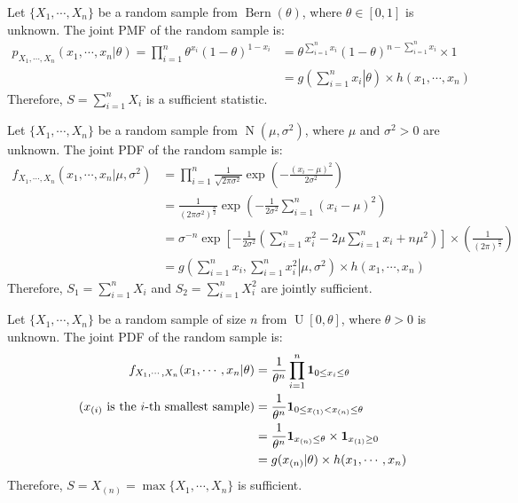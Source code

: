 \documentclass{huhtakm-template-book-v2}
\DeclareMathOperator{\Bern}{Bern}
\DeclareMathOperator{\N}{N}
\DeclareMathOperator{\U}{U}
\begin{document}
\begin{eg}
	\label{Chapter 1 (Example) Sufficient statistics of Bern(theta)}
	Let $\{X_{1},\cdots,X_{n}\}$ be a random sample from $\Bern(\theta)$, where $\theta\in[0,1]$ is unknown. The joint PMF of the random sample is:
	\begin{align*}
		p_{X_{1},\cdots,X_{n}}(x_{1},\cdots,x_{n}|\theta)=\prod_{i=1}^{n}\theta^{x_{i}}(1-\theta)^{1-x_{i}}&=\theta^{\sum_{i=1}^{n}x_{i}}(1-\theta)^{n-\sum_{i=1}^{n}x_{i}}\times 1\\
		&=g\left(\left.\sum_{i=1}^{n}x_{i}\right|\theta\right)\times h(x_{1},\cdots,x_{n})		
	\end{align*}
	Therefore, $S=\sum_{i=1}^{n}X_{i}$ is a sufficient statistic.
\end{eg}
\begin{eg}
	Let $\{X_{1},\cdots,X_{n}\}$ be a random sample from $\N(\mu,\sigma^{2})$, where $\mu$ and $\sigma^{2}>0$ are unknown. The joint PDF of the random sample is:
	\begin{align*}
		f_{X_{1},\cdots,X_{n}}(x_{1},\cdots,x_{n}|\mu,\sigma^{2})&=\prod_{i=1}^{n}\frac{1}{\sqrt{2\pi\sigma^{2}}}\exp\left(-\frac{(x_{i}-\mu)^{2}}{2\sigma^{2}}\right)\\
		&=\frac{1}{(2\pi\sigma^{2})^{\frac{n}{2}}}\exp\left(-\frac{1}{2\sigma^{2}}\sum_{i=1}^{n}(x_{i}-\mu)^{2}\right)\\
		&=\sigma^{-n}\exp\left[-\frac{1}{2\sigma^{2}}\left(\sum_{i=1}^{n}x_{i}^{2}-2\mu\sum_{i=1}^{n}x_{i}+n\mu^{2}\right)\right]\times\left(\frac{1}{(2\pi)^{
		\frac{n}{2}}}\right)\\
		&=g\left(\left.\sum_{i=1}^{n}x_{i},\sum_{i=1}^{n}x_{i}^{2}\right|\mu,\sigma^{2}\right)\times h(x_{1},\cdots,x_{n})
	\end{align*}
	Therefore, $S_{1}=\sum_{i=1}^{n}X_{i}$ and $S_{2}=\sum_{i=1}^{n}X_{i}^{2}$ are jointly sufficient.
\end{eg}
\begin{eg}
	Let $\{X_{1},\cdots,X_{n}\}$ be a random sample of size $n$ from $\U[0,\theta]$, where $\theta>0$ is unknown. The joint PDF of the random sample is:
	\begin{align*}
		f_{X_{1},\cdots,X_{n}}(x_{1},\cdots,x_{n}|\theta)&=\frac{1}{\theta^{n}}\prod_{i=1}^{n}\mathbf{1}_{0\leq x_{i}\leq\theta}\\
		\tag{$x_{(i)}$ is the $i$-th smallest sample}
		&=\frac{1}{\theta^{n}}\mathbf{1}_{0\leq x_{(1)}<x_{(n)}\leq\theta}\\
		&=\frac{1}{\theta^{n}}\mathbf{1}_{x_{(n)}\leq\theta}\times\mathbf{1}_{x_{(1)}\geq 0}\\
		&=g(x_{(n)}|\theta)\times h(x_{1},\cdots,x_{n})
	\end{align*}
	Therefore, $S=X_{(n)}=\max\{X_{1},\cdots,X_{n}\}$ is sufficient.
\end{eg}
\end{document}
